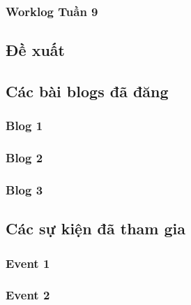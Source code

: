 \subsubsection{Worklog Tuần 9}


\newpage

\subsection{Đề xuất}



\newpage

\subsection{Các bài blogs đã đăng}

\subsubsection{Blog 1}


\subsubsection{Blog 2}


\subsubsection{Blog 3}


\newpage

\subsection{Các sự kiện đã tham gia}

\subsubsection{Event 1}


\subsubsection{Event 2}


\newpage

